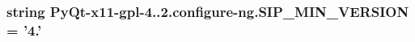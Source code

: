 \subsubsection[{S\+I\+P\+\_\+\+M\+I\+N\+\_\+\+V\+E\+R\+S\+I\+O\+N}]{\setlength{\rightskip}{0pt plus 5cm}string Py\+Qt-\/x11-\/gpl-\/4..\+2.configure-\/ng.\+S\+I\+P\+\_\+\+M\+I\+N\+\_\+\+V\+E\+R\+S\+I\+O\+N = '4.'}\label{namespacePyQt-x11-gpl-4_811_82_1_1configure-ng_abbfe52c95b989eca369d9e3f92cb0e30}
